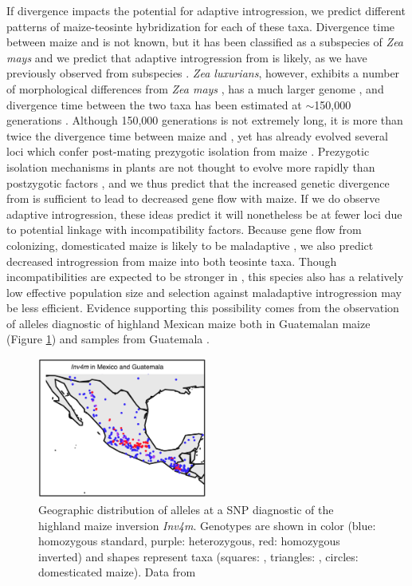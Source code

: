 If divergence impacts the potential for adaptive introgression, we predict different patterns of maize-teosinte hybridization for each of these taxa. 
Divergence time between maize and \zh{} is not known, but it has been classified as a subspecies of \emph{Zea mays} \citep{doebley1990systematics} and we predict that adaptive introgression from \zh{} is likely, as we have previously observed from subspecies \zm{} \citep{Hufford2013}.
\emph{Zea luxurians}, however, exhibits a number of morphological differences from \emph{Zea mays} \citep{doebley1980taxonomy}, has a much larger genome \citep{tenaillon2011genome}, and divergence time between the two taxa has been estimated at $\sim$150,000 generations \citep{Ross-Ibarra2009a}. 
Although 150,000 generations is not extremely long, it is more than twice the divergence time between maize and \zm{}, yet \zm{} has already evolved several loci which confer post-mating prezygotic isolation from maize \citep{evans2001teosinte,kermicle2010zea,kermicle2006gametophyte}.
Prezygotic isolation mechanisms in plants are not thought to evolve more rapidly than postzygotic factors \citep{widmer2009evolution}, and we thus predict that the increased genetic divergence from \zl is sufficient to lead to decreased gene flow with maize. 
If we do observe adaptive introgression, these ideas predict it will nonetheless be at fewer loci due to potential linkage with incompatibility factors. 
Because gene flow from colonizing, domesticated maize is likely to be maladaptive \citep{Hufford2013}, we also predict decreased introgression from maize into both  teosinte taxa. 
Though incompatibilities are expected to be stronger in \zl{}, this species also has a relatively low effective population size \citep{Ross-Ibarra2009a} and selection against maladaptive introgression may be less efficient.
Evidence supporting this possibility comes from the observation of alleles diagnostic of highland Mexican maize both in Guatemalan maize (Figure \ref{fig:inv4mmap}) and \zl{} samples from Guatemala \citep{Fang2012}.

\begin{figure}
  	\centering
  	\includegraphics[width=0.5\textwidth]{inv4m_lux}
  	\caption{Geographic distribution of alleles at a SNP diagnostic of the highland maize  inversion \emph{Inv4m}.  Genotypes are shown in color (blue: homozygous standard, purple: heterozygous, red: homozygous inverted) and shapes represent taxa (squares: \zm, triangles: \zp, circles: domesticated maize). Data from \citet{Fang2012}  } 
	\label{fig:inv4mmap}
\end{figure} 

